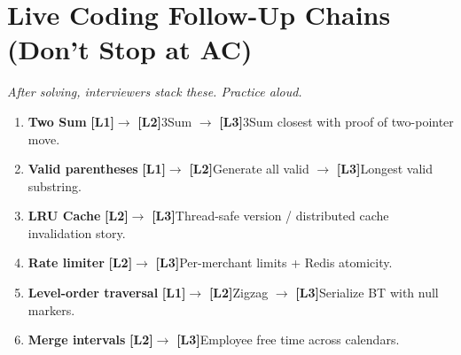 \documentclass[9pt,a4paper]{article}
\newcommand{\diffLone}{\textcolor{green!50!black}{\textbf{[L1]}}}
\newcommand{\diffLtwo}{\textcolor{orange!90!black}{\textbf{[L2]}}}
\newcommand{\diffLthree}{\textcolor{brutal}{\textbf{[L3]}}}
\begin{document}
\section{Live Coding Follow-Up Chains (Don't Stop at AC)}
\textit{After solving, interviewers stack these. Practice aloud.}

\begin{enumerate}
  \item \textbf{Two Sum} \diffLone $\rightarrow$ \diffLtwo 3Sum $\rightarrow$ \diffLthree 3Sum closest with proof of two-pointer move.
  \item \textbf{Valid parentheses} \diffLone $\rightarrow$ \diffLtwo Generate all valid $\rightarrow$ \diffLthree Longest valid substring.
  \item \textbf{LRU Cache} \diffLtwo $\rightarrow$ \diffLthree Thread-safe version / distributed cache invalidation story.
  \item \textbf{Rate limiter} \diffLtwo $\rightarrow$ \diffLthree Per-merchant limits + Redis atomicity.
  \item \textbf{Level-order traversal} \diffLone $\rightarrow$ \diffLtwo Zigzag $\rightarrow$ \diffLthree Serialize BT with null markers.
  \item \textbf{Merge intervals} \diffLtwo $\rightarrow$ \diffLthree Employee free time across calendars.
\end{enumerate}

\newpage
\end{document}

